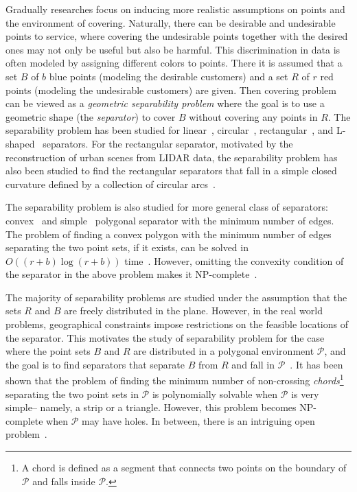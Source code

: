 \documentclass[a4paper,UKenglish]{lipics-v2018}
\theoremstyle{definition}
\begin{document}
Gradually researches focus on inducing more realistic assumptions on points and the environment of covering. Naturally, there can be desirable and undesirable points to service, where covering the undesirable points together with the desired ones may not only be useful but also be harmful. This discrimination in data is often modeled by assigning different colors to points. There it is assumed that a set $B$ of $b$ blue points (modeling the desirable customers) and a set $R$ of $r$ red points (modeling the undesirable customers) are given.  Then covering problem can be viewed as a \emph{geometric separability problem} where the goal is to use a geometric shape (the \emph{separator}) to cover $B$ without covering any points in $R$. The separability problem has been studied for linear~\cite{Megiddo-LP}, circular~\cite{sep-cir}, rectangular~\cite{sep-rect, kreveld-tech, farnaz-rect}, and L-shaped~\cite{sep-ours} separators.
For the rectangular separator, motivated by the reconstruction of urban scenes from LIDAR data, the separability problem has also been studied to find the rectangular separators that fall in a simple closed curvature defined by a collection of circular arcs~\cite{sep-rect, kreveld-tech}.

The separability problem is also studied for more general class of separators: convex~\cite{conv-sep} and simple~\cite{simple-fekete, simple-apprx-mitchel} polygonal separator with the minimum number of edges. The problem of finding a convex polygon with the minimum number of edges separating the two point sets, if it exists, can be solved in $O((r+b) \log(r+b))$ time~\cite{conv-sep}. However,  omitting the convexity condition of the separator in the above problem  makes it NP-complete~\cite{simple-fekete, simple-apprx-mitchel}.

The majority of separability problems are studied under the assumption that the sets $R$ and $B$ are freely distributed in the plane. However, in the real world problems, geographical constraints impose restrictions on the feasible locations of the separator. This motivates the study of separability problem for the case where the  point sets $B$ and $R$ are distributed in a polygonal environment $\mathcal P$, and the goal is to find separators that separate $B$ from $R$ and fall in $\mathcal P$~\cite{demaine-chord}. It has been shown that the problem of finding the minimum number of non-crossing \emph{chords}\footnote{A chord is defined as a segment that connects two points on the boundary of $\mathcal P$ and falls inside $\mathcal P$.} separating the two point sets in $\mathcal P$ is polynomially solvable when $\mathcal P$ is very simple-- namely, a strip or a triangle. However,  this problem becomes NP-complete when $\mathcal P$ may have holes. In between, there is an intriguing open problem~\cite{demaine-chord}.
\end{document}
